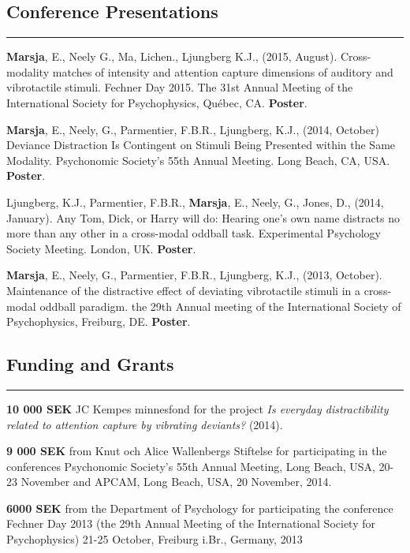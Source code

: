 \documentclass[]{article}
\begin{document}
\subsection{Conference Presentations}\label{conference-presentations}

\hrule

\textbf{Marsja}, E., Neely G., Ma, Lichen., Ljungberg K.J., (2015,
August). Cross-modality matches of intensity and attention capture
dimensions of auditory and vibrotactile stimuli. Fechner Day 2015. The
31st Annual Meeting of the International Society for Psychophysics,
Québec, CA. \textbf{Poster}.

\textbf{Marsja}, E., Neely, G., Parmentier, F.B.R., Ljungberg, K.J.,
(2014, October) Deviance Distraction Is Contingent on Stimuli Being
Presented within the Same Modality. Psychonomic Society's 55th Annual
Meeting. Long Beach, CA, USA. \textbf{Poster}.

Ljungberg, K.J., Parmentier, F.B.R., \textbf{Marsja}, E., Neely, G.,
Jones, D., (2014, January). Any Tom, Dick, or Harry will do: Hearing
one's own name distracts no more than any other in a cross-modal oddball
task. Experimental Psychology Society Meeting. London, UK.
\textbf{Poster}.

\textbf{Marsja}, E., Neely, G., Parmentier, F.B.R., Ljungberg, K.J.,
(2013, October). Maintenance of the distractive effect of deviating
vibrotactile stimuli in a cross-modal oddball paradigm. the 29th Annual
meeting of the International Society of Psychophysics, Freiburg, DE.
\textbf{Poster}.

\subsection{Funding and Grants}\label{funding-and-grants}

\hrule

\textbf{10 000 SEK} JC Kempes minnesfond for the project \emph{Is
everyday distractibility related to attention capture by vibrating
deviants?} (2014).

\textbf{9 000 SEK} from Knut och Alice Wallenbergs Stiftelse for
participating in the conferences Psychonomic Society's 55th Annual
Meeting, Long Beach, USA, 20-23 November and APCAM, Long Beach, USA, 20
November, 2014.

\textbf{6000 SEK} from the Department of Psychology for participating
the conference Fechner Day 2013 (the 29th Annual Meeting of the
International Society for Psychophysics) 21-25 October, Freiburg i.Br.,
Germany, 2013
\end{document}
